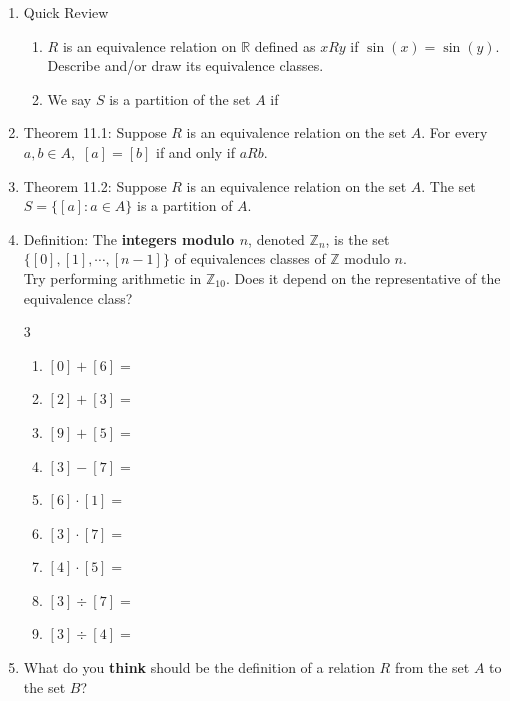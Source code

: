 \documentclass[12pt]{article}
\renewcommand{\emph}[1]{\textsf{\textbf{#1}}}
\newcommand{\Z}{\mathbb{Z}}
\newcommand{\R}{\mathbb{R}}
\begin{document}
\begin{enumerate}
\item Quick Review
\vspace*{-0.5cm}
	\begin{enumerate}
	\item $R$ is an equivalence relation on $\R$ defined as $xRy$ if $\sin(x)=\sin(y).$ Describe and/or draw its equivalence classes.
	\vfill 
	
	\item We say $S$ is a partition of the set $A$ if 	
	\vspace{.75in}
	\end{enumerate}
\item Theorem 11.1: Suppose $R$ is an equivalence relation on the set $A.$ For every $a, b \in A,$ $[a]=[b]$ if and only if $aRb.$
\vfill
\item Theorem 11.2: Suppose $R$ is an equivalence relation on the set $A$. The set $S=\{[a] : a \in A\}$ is a partition of $A.$
\vfill
\newpage
\item Definition: The \textbf{integers modulo $n$}, denoted $\Z_n$, is the set $\{[0],[1], \cdots, [n-1]\}$ of equivalences classes of $\Z$ modulo $n.$\\
Try performing arithmetic in $\Z_{10}$. Does it depend on the representative of the equivalence class?
	\begin{multicols}{3}
		\begin{enumerate}
		\item $[0]+[6]=$\\
		\item $[2]+[3]= $\\
		\item $[9]+[5]=$\\
		\item $[3] - [7]=$\\
		\item $[6] \cdot [1]=$\\
		\item $[3] \cdot [7]=$	\\
		\item $[4] \cdot [5]=$	\\
		\item $[3] \div [7]=$\\	
		\item $[3] \div [4]=$\\
		\end{enumerate}
	\end{multicols}
	\vfill
\item What do you \emph{think} should be the definition of a relation $R$ from the set $A$ to the set $B$?

\end{enumerate}
\end{document}
